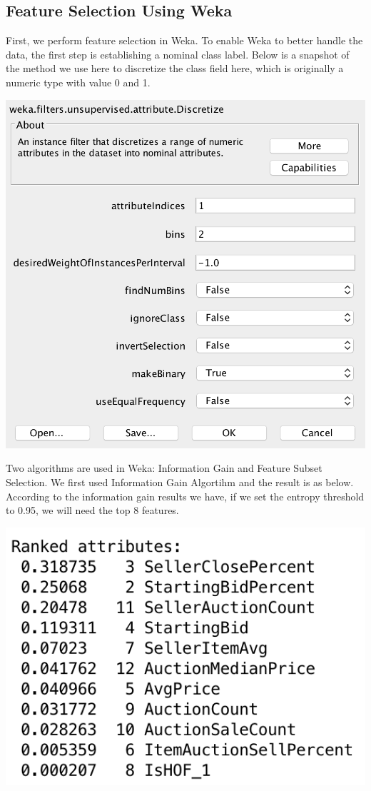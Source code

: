 \documentclass[CEJM,PDF]{cej} %
\begin{document}
\subsection{Feature Selection Using Weka}
First, we perform feature selection in Weka. To enable Weka to better handle the data, the first step is establishing a nominal class label. Below is a snapshot of the method we use here to discretize the class field here, which is originally a numeric type with value 0 and 1.

{\centering
    \vspace{3 mm}
    \includegraphics[scale=0.4]{weka-discretize_label_column.png}
    \par
}


Two algorithms are used in Weka: Information Gain and Feature Subset Selection. We first used Information Gain Algortihm and the result is as below. According to the information gain results we have, if we set the entropy threshold to 0.95, we will need the top 8 features.

{\centering
    \vspace{3 mm}
    \includegraphics[scale=0.6]{weka-InfoGain.png}
    \par
}
\end{document}
